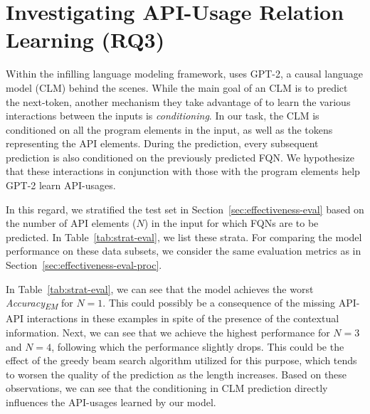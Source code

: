 \section{Investigating API-Usage Relation Learning (RQ3)}
\label{sec:eval}

%

Within the infilling language modeling framework, {\tool} uses GPT-2, a causal language model (CLM) behind the scenes. While the main goal of an CLM is to predict the next-token, another mechanism they take advantage of to learn the various interactions between the inputs is {\em conditioning}. In our task, the CLM is conditioned on all the program elements in the input, as well as the \blank tokens representing the API elements. During the prediction, every subsequent prediction is also conditioned on the previously predicted FQN. We hypothesize that these interactions in conjunction with those with the program elements help GPT-2 learn API-usages.

In this regard, we stratified the test set in Section~\ref{sec:effectiveness-eval} based on the number of API elements ($N$) in the input for which FQNs are to be predicted. In Table~\ref{tab:strat-eval}, we list these strata. For comparing the model performance on these data subsets, we consider the same evaluation metrics as in Section~\ref{sec:effectiveness-eval-proc}.

In Table~\ref{tab:strat-eval}, we can see that the model achieves the worst \textit{Accuracy\textsubscript{EM}} for $N=1$. This could possibly be a consequence of the missing API-API interactions in these examples in spite of the presence of the contextual information. Next, we can see that we achieve the highest performance for $N=3$ and $N=4$, following which the performance slightly drops. This could be the effect of the greedy beam search algorithm utilized for this purpose, which tends to worsen the quality of the prediction as the length increases. Based on these observations, we can see that the conditioning in CLM prediction directly influences the API-usages learned by our model.
